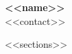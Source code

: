 \documentclass[11pt,letterpaper]{article}
\begin{document}
\begin{center}
    {\Large \textbf{<<name>>}} \\
    \vspace{0.3em}
    <<contact>>
\end{center}

\vspace{0.5em}

<<sections>>
\end{document}
